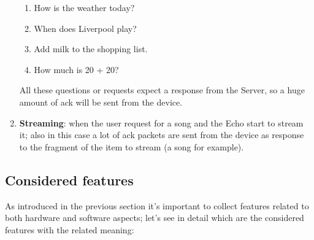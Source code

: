 \documentclass[sigconf]{acmart}
\begin{document}
\begin{enumerate}
\begin{enumerate}
            \item How is the weather today?
            \item When does Liverpool play?
            \item Add milk to the shopping list.
            \item How much is 20 + 20?
        \end{enumerate}
        All these questions or requests expect a response from the Server, so a huge amount of ack will be sent from the device.
        \item \textbf{Streaming}: when the user request for a song and the Echo start to stream it; also in this case a lot of ack packets are sent from the device as response to the fragment of the item to stream (a song for example).
    \end{enumerate}
	\subsection{Considered features}
    As introduced in the previous section it's important to collect features related to both hardware and software aspects; let's see in detail which are the considered features with the related meaning:
\end{document}
